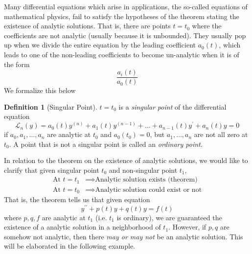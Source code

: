 \documentclass{article}
\theoremstyle{remark}
\theoremstyle{definition}
\newtheorem{definition}{Definition}[section]
\begin{document}
    Many differential equations which arise in applications, the so-called equations of mathematical physics, fail to satisfy the hypotheses of the theorem stating the existence of analytic solutions. That is, there are points $t = t_0$ where the coefficients are not analytic (usually because it is unbounded). They usually pop up when we divide the entire equation by the leading coefficient $a_0 (t)$, which leads to one of the non-leading coefficients to become un-analytic when it is of the form 
    \[\frac{a_i(t)}{a_0 (t)} \]
    We formalize this below 

    \begin{definition}[Singular Point]
    $t = t_0$ is a \textit{singular point} of the differential equation
    \[\mathcal{L}_n (y) = a_0 (t) y^{(n)} + a_1 (t) y^{(n-1)} + \ldots + a_{n-1} (t) y^\prime + a_n (t) y = 0\]
    if $a_0, a_1, \ldots, a_n$ are analytic at $t_0$ and $a_0 (t_0) = 0$, but $a_1, \ldots, a_n$ are not all zero at $t_0$. A point that is not a singular point is called an \textit{ordinary point}. 
    \end{definition}

    In relation to the theorem on the existence of analytic solutions, we would like to clarify that given singular point $t_0$ and non-singular point $t_1$, 
    \begin{align*}
        \text{At } t = t_1 & \implies \text{Analytic solution exists (theorem)} \\
        \text{At } t = t_0 & \implies \text{Analytic solution could exist or not} 
    \end{align*}
    That is, the theorem tells us that given equation
    \[y^{\prime\prime} + p(t) y + q(t) y = f(t)\]
    where $p, q, f$ are analytic at $t_1$ (i.e. $t_1$ is ordinary), we are guaranteed the existence of a analytic solution in a neighborhood of $t_1$. However, if $p, q$ are somehow not analytic, then there \textit{may or may not} be an analytic solution. This will be elaborated in the following example. 
\end{document}
